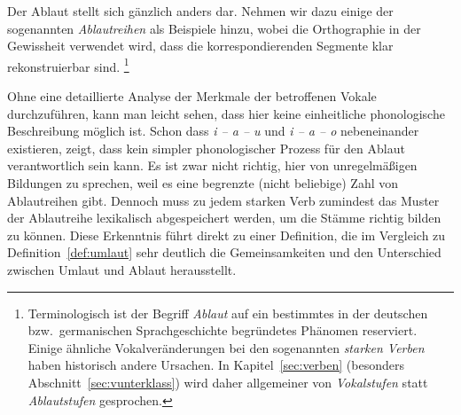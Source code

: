 
Der Ablaut stellt sich gänzlich anders dar.
Nehmen wir dazu einige der sogenannten \textit{Ablautreihen} als Beispiele hinzu, wobei die Orthographie in der Gewissheit verwendet wird, dass die korrespondierenden Segmente klar rekonstruierbar sind.%
\footnote{Terminologisch ist der Begriff \textit{Ablaut} auf ein bestimmtes in der deutschen bzw.\ germanischen Sprachgeschichte begründetes Phänomen reserviert.
Einige ähnliche Vokalveränderungen bei den sogenannten \textit{starken Verben} haben historisch andere Ursachen.
In Kapitel~\ref{sec:verben} (besonders Abschnitt~\ref{sec:vunterklass}) wird daher allgemeiner von \textit{Vokalstufen} statt \textit{Ablautstufen} gesprochen.}

\begin{exe}
  \ex\label{ex:morph8827}
  \begin{xlist}
  \end{xlist}
\end{exe}

Ohne eine detaillierte Analyse der Merkmale der betroffenen Vokale durchzuführen, kann man leicht sehen, dass hier keine einheitliche phonologische Beschreibung möglich ist.
Schon dass \textit{i -- a -- u} und \textit{i -- a -- o} nebeneinander existieren, zeigt, dass kein simpler phonologischer Prozess für den Ablaut verantwortlich sein kann.
Es ist zwar nicht richtig, hier von unregelmäßigen Bildungen zu sprechen, weil es eine begrenzte (nicht beliebige) Zahl von Ablautreihen gibt.
Dennoch muss zu jedem starken Verb zumindest das Muster der Ablautreihe lexikalisch abgespeichert werden, um die Stämme richtig bilden zu können.
Diese Erkenntnis führt direkt zu einer Definition, die im Vergleich zu Definition~\ref{def:umlaut} sehr deutlich die Gemeinsamkeiten und den Unterschied zwischen Umlaut und Ablaut herausstellt.


